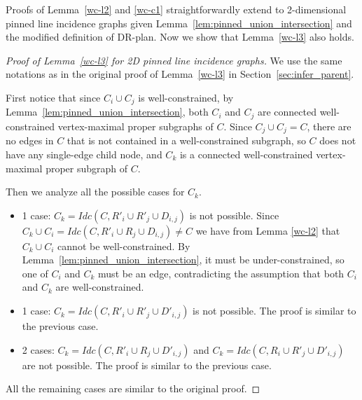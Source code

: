 Proofs of Lemma~\ref{wc-l2} and \ref{wc-c1} straightforwardly extend to 2-dimensional pinned line incidence graphs 
given Lemma~\ref{lem:pinned_union_intersection} and the modified definition of DR-plan.
Now we  show that Lemma~\ref{wc-l3} also holds. 

\begin{proof}[Proof of Lemma~\ref{wc-l3} for 2D pinned line incidence graphs]
We use the same notations as in the original proof of Lemma~\ref{wc-l3} in Section~\ref{sec:infer_parent}.

First notice that since $C_i \cup C_j$ is well-constrained, by Lemma~\ref{lem:pinned_union_intersection}, 
both $C_i$ and $C_j$ are connected well-constrained vertex-maximal proper subgraphs of  $C$.
Since $C_j \cup C_j = C$, there are no edges in $C$ that is not contained in a well-constrained subgraph, so $C$ does not have any single-edge child node, and $C_k$ is a connected well-constrained vertex-maximal proper subgraph of  $C$.

Then we analyze all the possible cases for $C_k$.
\begin{itemize}
    \item 1 case: $C_k=Idc(C,R'_i\cup R'_j\cup D_{i,j})$ is not possible. Since $C_k\cup C_i = Idc(C,R'_i\cup R_j\cup D_{i,j})\neq C$ we have from Lemma \ref{wc-l2} that $C_k\cup C_i$ cannot be well-constrained. 
    By Lemma~\ref{lem:pinned_union_intersection}, it must be under-constrained, 
    so one of $C_i$ and $C_k$ must be an edge, contradicting the assumption that both $C_i$ and $C_k$ are well-constrained.

    \item 1 case: $C_k=Idc(C,R'_i\cup R'_j\cup D'_{i,j})$ is not possible. The proof is similar to the previous case.  

    \item 2 cases: $C_k=Idc(C,R'_i\cup R_j\cup D'_{i,j})$ and $C_k=Idc(C,R_i\cup R'_j\cup D'_{i,j})$ are not possible. 
    The proof is similar to the previous case.  
\end{itemize}

All the remaining cases are similar to the original proof.

\end{proof}

